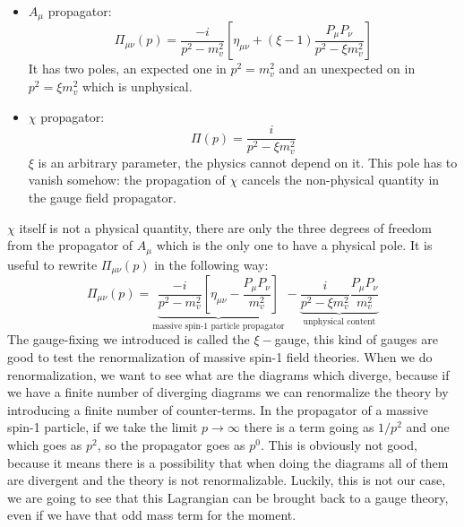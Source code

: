 \documentclass[../main.tex]{subfiles}
\begin{document}
\begin{itemize}
    \item $A_\mu$ propagator:
    \[
    \Pi_{\mu\nu}(p)=\frac{-i}{p^2-m_v^2}\left[\eta_{\mu\nu}+(\xi-1)\frac{P_\mu P_\nu}{p^2-\xi m_v^2}\right]
    \]
    It has two poles, an expected one in $p^2=m_v^2$ and an unexpected on in $p^2=\xi m_v^2$ which is unphysical.
    \item $\chi$ propagator:
    \[
    \Pi(p)=\frac{i}{p^2-\xi m_v^2}
    \]
    $\xi$ is an arbitrary parameter, the physics cannot depend on it. This pole has to vanish somehow: the propagation of $\chi$ cancels the non-physical quantity in the gauge field propagator. 
\end{itemize}
$\chi$ itself is not a physical quantity, there are only the three degrees of freedom from the propagator of $A_\mu$ which is the only one to have a physical pole. It is useful to rewrite $\Pi_{\mu\nu}(p)$ in the following way:
\[
\Pi_{\mu\nu}(p)=\underbrace{\frac{-i}{p^2-m_v^2}\left[\eta_{\mu\nu}-\frac{P_\mu P_\nu}{m_v^2}\right]}_{\text{massive spin-1 particle propagator}}-\underbrace{\frac{i}{p^2-\xi m_v^2}\frac{P_\mu P_\nu}{m_v^2}}_{\text{unphysical content}}
\]
The gauge-fixing we introduced is called the $\xi-$gauge, this kind of gauges are good to test the renormalization of massive spin-1 field theories. When we do renormalization, we want to see what are the diagrams which diverge, because if we have a finite number of diverging diagrams we can renormalize the theory by introducing a finite number of counter-terms. In the propagator of a massive spin-1 particle, if we take the limit $p\to\infty$ there is a term going as $1/p^2$ and one which goes as $p^2$, so the propagator goes as $p^0$. This is obviously not good, because it means there is a possibility that when doing the diagrams all of them are divergent and the theory is not renormalizable. Luckily, this is not our case, we are going to see that this Lagrangian can be brought back to a gauge theory, even if we have that odd mass term for the moment.
\end{document}
